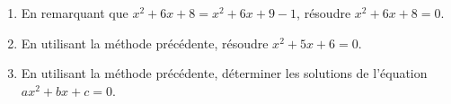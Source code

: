 
\begin{enumerate}
\item En remarquant que $x^2+6x+8=x^2+6x+9-1$, résoudre $x^2+6x+8=0$.
\item En utilisant la méthode précédente, résoudre $x^2+5x+6=0$.
\item En utilisant la méthode précédente, déterminer les solutions de l'équation $ax^2+bx+c=0$.
\end{enumerate}
